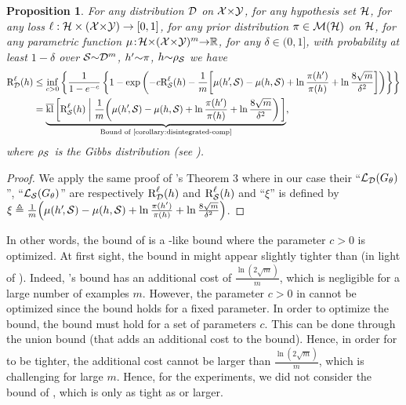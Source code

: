 \documentclass[twoside]{article}
\theoremstyle{plain}
\newtheorem{proposition}[theorem]{Proposition}
\begin{document}
\begin{proposition}\label{proposition:disintegrated-catoni-comp}
For any distribution $\Dcal$ on $\Xcal{\times}\Ycal$, for any hypothesis set $\Hcal$, for any loss $\loss : \Hcal\times(\Xcal{\times}\Ycal) \to [0,1]$, for any prior distribution $\P\in\Mcal(\Hcal)$ on $\Hcal$, for any parametric function $\comp\!:\! \Hcal{\times}(\Xcal{\times}\Ycal)^m{\to}\R$, for any $\delta\!\in\!(0,1]$, with probability at least $1{-}\delta$ over $\Scal{\sim}\Dcal^m$, $h'{\sim}\P$, $h{\sim}\AQ$ we have
    \begin{align*}
    \RiskLoss_{\Dcal}(h) &\le \inf_{c>0}\LC\frac{1}{1-e^{-c}}\LC1-\exp\LP -c\RiskLoss_{\Scal}(h) - \frac{1}{m}\!\LB\comp(h'\!,\Scal) - \comp(h,\Scal) +\ln\frac{\P(h')}{\P(h)} + \ln\frac{8\sqrt{m}}{\delta^2}\RB\RP\RC\RC\\
    &= \underbrace{\klmax\LB\RiskLoss_{\Scal}(h) \;\middle|\; \frac{1}{m}\!\LP\comp(h'\!,\Scal) - \comp(h,\Scal) +\ln\frac{\P(h')}{\P(h)} + \ln\frac{8\sqrt{m}}{\delta^2}\RP\,\RB}_{\text{Bound of \Cref{corollary:disintegrated-comp}}},
    \end{align*}
where $\AQ$ is the Gibbs distribution (see ).
\end{proposition}
\begin{proof}
We apply the same proof of \citet{letarte2019dichotomize}'s Theorem 3 where in our case their ``$\Lcal_{\Dcal}(G_{\theta})$'', ``$\Lcal_{\Scal}(G_{\theta})$'' are respectively $\RiskLoss_{\Dcal}(h)$ and $\RiskLoss_{\Scal}(h)$ and ``$\xi$'' is defined by $\xi\defeq\frac{1}{m}\!\LP\comp(h'\!,\Scal) - \comp(h,\Scal) +\ln\frac{\P(h')}{\P(h)} + \ln\frac{8\sqrt{m}}{\delta^2}\RP$.
\end{proof}

In other words, the bound of  is a \citeauthor{catoni2007pac}-like bound where the parameter $c>0$ is optimized.
At first sight, the bound in  might appear slightly tighter than  (in light of ).
Indeed, 's bound has an additional cost of $\frac{\ln(2\sqrt{m})}{m}$, which is negligible for a large number of examples $m$. 
However, the parameter $c>0$ in  cannot be optimized since the bound holds for a fixed parameter.
In order to optimize the bound, the bound must hold for a set of parameters $c$.
This can be done through the union bound (that adds an additional cost to the bound).
Hence, in order for  to be tighter, the additional cost cannot be larger than $\frac{\ln(2\sqrt{m})}{m}$, which is challenging for large $m$.
Hence, for the experiments, we did not consider the bound of , which is only as tight as  or larger.
\end{document}
